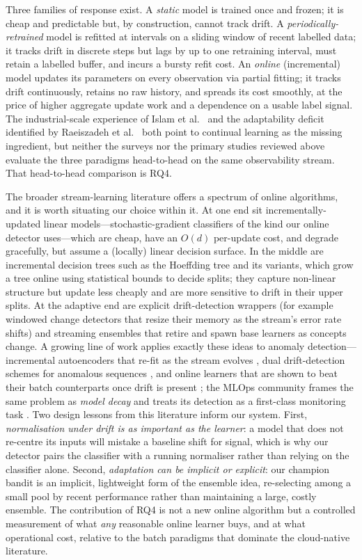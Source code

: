 \documentclass[acmsmall]{acmart}
\begin{document}
Three families of response exist. A \emph{static} model is trained once and frozen; it is cheap and predictable but, by construction, cannot track drift. A \emph{periodically-retrained} model is refitted at intervals on a sliding window of recent labelled data; it tracks drift in discrete steps but lags by up to one retraining interval, must retain a labelled buffer, and incurs a bursty refit cost. An \emph{online} (incremental) model updates its parameters on every observation via partial fitting; it tracks drift continuously, retains no raw history, and spreads its cost smoothly, at the price of higher aggregate update work and a dependence on a usable label signal. The industrial-scale experience of Islam et al.\ \cite{islam2021} and the adaptability deficit identified by Raeiszadeh et al.\ \cite{raeiszadeh2026} both point to continual learning as the missing ingredient, but neither the surveys nor the primary studies reviewed above evaluate the three paradigms head-to-head on the same observability stream. That head-to-head comparison is RQ4.

The broader stream-learning literature offers a spectrum of online algorithms, and it is worth situating our choice within it. At one end sit incrementally-updated linear models---stochastic-gradient classifiers of the kind our online detector uses---which are cheap, have an $O(d)$ per-update cost, and degrade gracefully, but assume a (locally) linear decision surface. In the middle are incremental decision trees such as the Hoeffding tree and its variants, which grow a tree online using statistical bounds to decide splits; they capture non-linear structure but update less cheaply and are more sensitive to drift in their upper splits. At the adaptive end are explicit drift-detection wrappers (for example windowed change detectors that resize their memory as the stream's error rate shifts) and streaming ensembles that retire and spawn base learners as concepts change. A growing line of work applies exactly these ideas to anomaly detection---incremental autoencoders that re-fit as the stream evolves \cite{li2023autoencoder}, dual drift-detection schemes for anomalous sequences \cite{li2024incremental}, and online learners that are shown to beat their batch counterparts once drift is present \cite{wette2024omlad}; the MLOps community frames the same problem as \emph{model decay} and treats its detection as a first-class monitoring task \cite{leest2025mlmonitoring}. Two design lessons from this literature inform our system. First, \emph{normalisation under drift is as important as the learner}: a model that does not re-centre its inputs will mistake a baseline shift for signal, which is why our detector pairs the classifier with a running normaliser rather than relying on the classifier alone. Second, \emph{adaptation can be implicit or explicit}: our champion bandit is an implicit, lightweight form of the ensemble idea, re-selecting among a small pool by recent performance rather than maintaining a large, costly ensemble. The contribution of RQ4 is not a new online algorithm but a controlled measurement of what \emph{any} reasonable online learner buys, and at what operational cost, relative to the batch paradigms that dominate the cloud-native literature.
\end{document}
